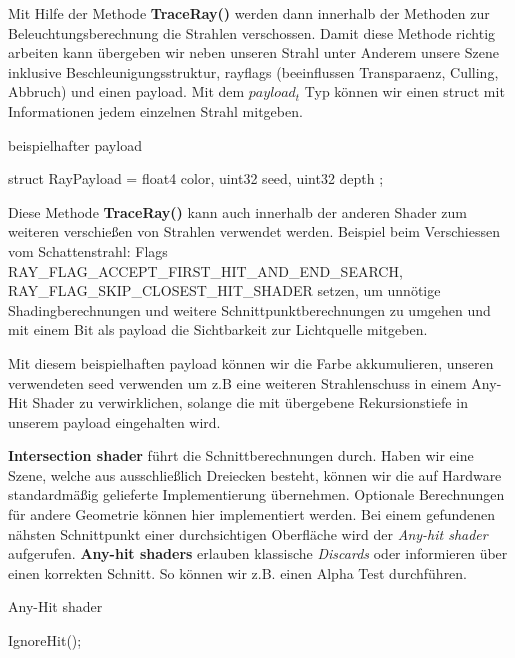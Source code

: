 Mit Hilfe der Methode \textbf{TraceRay()} werden dann innerhalb der Methoden zur Beleuchtungsberechnung 
die Strahlen verschossen. Damit diese Methode richtig arbeiten kann übergeben wir neben unseren Strahl 
unter Anderem  unsere Szene inklusive Beschleunigungsstruktur, rayflags 
(beeinflussen Transparaenz, Culling, Abbruch)\cite{RayFlags} und einen payload.
Mit dem \textit{$payload_t$} Typ können wir einen struct mit Informationen jedem einzelnen Strahl mitgeben.

\begin{algorithm}[H]
    \caption{beispielhafter payload}
    \begin{algorithmic}[1]
        \State struct RayPayload = {
            \State        float4 color, uint32 seed, uint32 depth
            \State };
        \end{algorithmic}
        \label{alg:payload}
    \end{algorithm}
    
Diese Methode \textbf{TraceRay()} kann auch innerhalb der anderen Shader zum weiteren verschießen
von Strahlen verwendet werden. Beispiel beim Verschiessen vom Schattenstrahl: Flags 
RAY\_FLAG\_ACCEPT\_FIRST\_HIT\_AND\_END\_SEARCH, \newline
RAY\_FLAG\_SKIP\_CLOSEST\_HIT\_SHADER setzen, um unnötige 
Shadingberechnungen und weitere Schnittpunktberechnungen zu umgehen und mit einem Bit als payload 
die Sichtbarkeit zur Lichtquelle mitgeben.


Mit diesem beispielhaften payload können wir die Farbe akkumulieren, unseren verwendeten 
seed verwenden um z.B eine weiteren Strahlenschuss in einem Any-Hit Shader zu verwirklichen,  
solange die mit übergebene Rekursionstiefe in unserem payload eingehalten wird.  

\textbf{Intersection shader} führt die Schnittberechnungen durch.
Haben wir eine Szene, welche aus ausschließlich Dreiecken besteht, können wir
die auf Hardware standardmäßig gelieferte Implementierung übernehmen. 
Optionale Berechnungen für andere Geometrie können hier implementiert werden.
Bei einem gefundenen nähsten Schnittpunkt einer durchsichtigen Oberfläche wird der 
\textit{Any-hit shader} aufgerufen.
\textbf{Any-hit shaders} erlauben klassische \textit{Discards} oder informieren
über einen korrekten Schnitt. So können wir z.B. einen Alpha Test durchführen.

\begin{algorithm}[H]
    \caption{Any-Hit shader}
    \begin{algorithmic}[1]
        \State IgnoreHit();
        \EndIf
    \end{algorithmic}
    \label{alg:any hit}
\end{algorithm}

